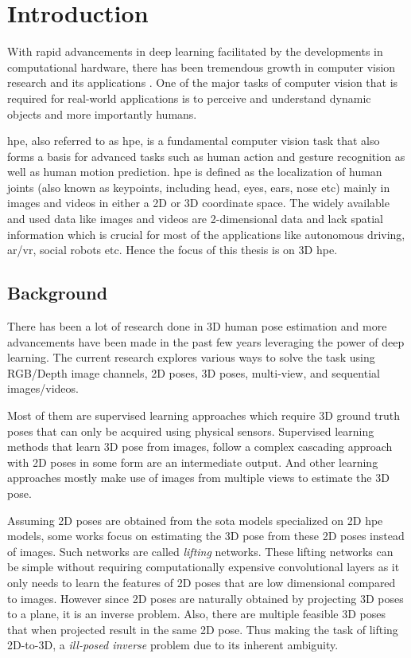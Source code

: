 \chapter{Introduction}
\label{chap:introduction}
With rapid advancements in deep learning facilitated by the developments in computational hardware, there has been tremendous growth in computer vision research and its applications \cite{AIandCompute}. One of the major tasks of computer vision that is required for real-world applications is to perceive and understand dynamic objects and more importantly humans.

\acl{hpe}, also referred to as \ac{hpe}, is a fundamental computer vision task that also forms a basis for advanced tasks such as human action and gesture recognition as well as human motion prediction. \ac{hpe} is defined as the localization of human joints (also known as keypoints, including head, eyes, ears, nose etc) mainly in images and videos in either a 2D or 3D coordinate space. The widely available and used data like images and videos are 2-dimensional data and lack spatial information which is crucial for most of the applications like autonomous driving, \ac{ar/vr}, social robots etc. Hence the focus of this thesis is on 3D \ac{hpe}.

\section{Background}
\label{sec:background}

There has been a lot of research done in 3D human pose estimation and more advancements have been made in the past few years leveraging the power of deep learning. The current research explores various ways to solve the task using RGB/Depth image channels, 2D poses, 3D poses, multi-view, and sequential images/videos. 

Most of them are supervised learning approaches which require 3D ground truth poses that can only be acquired using physical sensors. Supervised learning methods that learn 3D pose from images, follow a complex cascading approach with 2D poses in some form are an intermediate output. And other learning approaches mostly make use of images from multiple views to estimate the 3D pose. 

Assuming 2D poses are obtained from the \ac{sota} models specialized on 2D \ac{hpe} models, some works focus on estimating the 3D pose from these 2D poses instead of images. Such networks are called \textit{lifting} networks. These lifting networks can be simple without requiring computationally expensive convolutional layers as it only needs to learn the features of 2D poses that are low dimensional compared to images. However since 2D poses are naturally obtained by projecting 3D poses to a plane, it is an inverse problem. Also, there are multiple feasible 3D poses that when projected result in the same 2D pose. Thus making the task of lifting 2D-to-3D, a \textit{ill-posed inverse} problem due to its inherent ambiguity.

